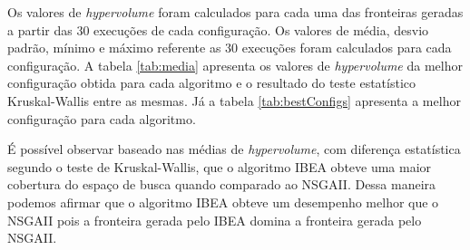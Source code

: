 \documentclass[conference]{IEEEtran}
\begin{document}
Os valores de \textit{hypervolume} foram calculados para cada uma das fronteiras geradas a partir das 30 execuções de cada configuração. Os valores de média, desvio padrão, mínimo e máximo referente as 30 execuções foram calculados para cada configuração. A tabela \ref{tab:media} apresenta os valores de \textit{hypervolume}  da melhor configuração obtida para cada algoritmo e o resultado do teste estatístico Kruskal-Wallis \cite{kruskal1952use} entre as mesmas. Já a tabela \ref{tab:bestConfigs} apresenta a melhor configuração para cada algoritmo. 


\begin{table}[h]
	\centering
	\caption{Média, Desvio Padrão, Mínimo, Máximo e teste estatístico de Kruskal-Wallis}
	\label{tab:media}
	
\end{table}

É possível observar baseado nas médias de \textit{hypervolume}, com diferença estatística segundo o teste de Kruskal-Wallis, que o algoritmo IBEA obteve uma maior cobertura do espaço de busca quando comparado ao NSGAII. Dessa maneira podemos afirmar que o algoritmo IBEA obteve um desempenho melhor que o NSGAII pois a fronteira gerada pelo IBEA domina a fronteira gerada pelo NSGAII.


\begin{table}[h]
	\centering
	\caption{Melhores configurações de parâmetros para os algoritmos}
	\label{tab:bestConfigs}
\end{table}
\end{document}

